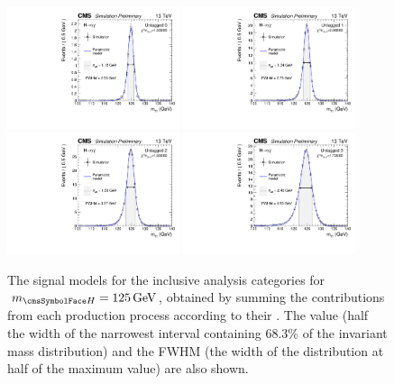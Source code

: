 \begin{figure}[ht!]
\centering
\includegraphics[width=0.45\textwidth]{modellingFigures/DCBpG/UntaggedTag_0.pdf} 
\includegraphics[width=0.45\textwidth]{modellingFigures/DCBpG/UntaggedTag_1.pdf} \\
\includegraphics[width=0.45\textwidth]{modellingFigures/DCBpG/UntaggedTag_2.pdf} 
\includegraphics[width=0.45\textwidth]{modellingFigures/DCBpG/UntaggedTag_3.pdf}  

\caption{The signal models for the inclusive analysis categories for $\mH=125\GeV$, obtained by summing the contributions from each production process according to their \effxacc. The \effSigma value (half the width of the narrowest interval containing 68.3\% of the invariant mass distribution) and the FWHM (the width of the distribution at half of the maximum value) are also shown.}

\label{fig:model:sig_model_per_category_inc}
\end{figure}

